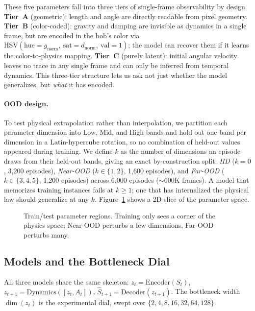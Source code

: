 \documentclass[letterpaper]{article} %
\begin{document}
These five parameters fall into three tiers of single-frame observability by design. \textbf{Tier~A} (geometric): length and angle are directly readable from pixel geometry. \textbf{Tier~B} (color-coded): gravity and damping are invisible as dynamics in a single frame, but are encoded in the bob's color via $\mathrm{HSV}(\text{hue}=g_\text{norm},\ \text{sat}=d_\text{norm},\ \text{val}=1)$; the model can recover them if it learns the color-to-physics mapping. \textbf{Tier~C} (purely latent): initial angular velocity leaves no trace in any single frame and can only be inferred from temporal dynamics. This three-tier structure lets us ask not just whether the model generalizes, but \emph{what} it has encoded.

\paragraph{OOD design.}
To test physical extrapolation rather than interpolation, we partition each parameter dimension into Low, Mid, and High bands and hold out one band per dimension in a Latin-hypercube rotation, so no combination of held-out values appeared during training. We define $k$ as the number of dimensions an episode draws from their held-out bands, giving an exact by-construction split: \emph{IID} ($k{=}0$, 3{,}200 episodes), \emph{Near-OOD} ($k{\in}\{1,2\}$, 1{,}600 episodes), and \emph{Far-OOD} ($k{\in}\{3,4,5\}$, 1{,}200 episodes) across 6{,}000 episodes (${\sim}600$K frames). A model that memorizes training instances fails at $k\geq1$; one that has internalized the physical law should generalize at any $k$. Figure~\ref{fig:ood_split} shows a 2D slice of the parameter space.

\begin{figure}[t]
    \centering
    
    \caption{Train/test parameter regions. Training only sees a corner of the
    physics space; Near-OOD perturbs a few dimensions, Far-OOD perturbs many.}
    \label{fig:ood_split}
\end{figure}

\subsection{Models and the Bottleneck Dial}
\label{sec:dial}

All three models share the same skeleton: $z_t = \mathrm{Encoder}(S_t)$, $z_{t+1} = \mathrm{Dynamics}([z_t, A_t])$, $\hat{S}_{t+1} = \mathrm{Decoder}(z_{t+1})$. The bottleneck width $\dim(z_t)$ is the experimental dial, swept over $\{2, 4, 8, 16, 32, 64, 128\}$.
\end{document}
